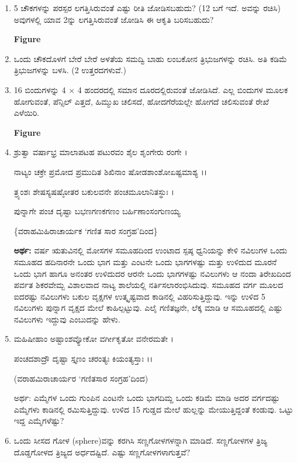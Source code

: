 \begin{enumerate}
\item 5 ಚೌಕಗಳನ್ನು ಪರಸ್ಪರ ಲಗತ್ತಿಸಿರುವಂತೆ ಎಷ್ಟು ರೀತಿ ಜೋಡಿಸಬಹುದು? (12 ಬಗೆ ಇದೆ. ಅವನ್ನು ರಚಿಸಿ) ಅವುಗಳಲ್ಲಿ ಯಾವ 2ನ್ನು ಲಗತ್ತಿಸಿರುವಂತೆ ಜೋಡಿಸಿ ಈ ಆಕೃತಿ ಬರಿಸಬಹುದು? 
\begin{center}
{\bf Figure}
\end{center}

\item ಒಂದು ಚೌಕದೊಳಗೆ ಬೇರೆ ಬೇರೆ ಅಳತೆಯ ಸಮದ್ವಿ ಬಾಹು ಲಂಬಕೋನ ತ್ರಿಭುಜಗಳನ್ನು ರಚಿಸಿ. ಅತಿ ಕಡಿಮೆ ತ್ರಿಭುಜಗಳನ್ನು ಬಳಸಿ. (2 ಉತ್ತರದಗಳುವೆ.)

\item 16 ಬಿಂದುಗಳನ್ನು 4 $\times$ 4 ಹಂದರದಲ್ಲಿ ಸಮಾನ ದೂರದಲ್ಲಿರುವಂತೆ ಜೋಡಿಸಿದೆ. ಎಲ್ಲ ಬಿಂದುಗಳ ಮೂಲಕ ಹೋಗುವಂತೆ, ಪೆನ್ಸಿಲ್ ಎತ್ತದೆ, ಹಿಮ್ಮುಖ ಚಲಿಸದೆ, ಹೋದಗೆರೆಯಲ್ಲೇ ಹೋಗದೆ ಚಲಿಸುವಂತೆ ರೇಖೆ ಎಳೆಯಿರಿ. 
\begin{center}
{\bf Figure}
\end{center}


\item ಶ್ರುತ್ವಾ ವರ್ಷಾಭ್ರ ಮಾಲಾಪಟಹ ಪಟುರವಂ ಶೈಲ ಶೃಂಗೇರು ರಂಗೇ ।

ನಾಟ್ಯಂ ಚಕ್ರೇ ಪ್ರಮೋದ ಪ್ರಮುದಿತ ಶಿಖಿನಾಂ ಷೋಡಶಾಂಶೋಏಷ್ಟಮಾಶ್ಯ ।।

ತ್ರ್ಯಂಶಃ ಶೇಷಸ್ಯಷಷ್ಠೋತರ ಬಕುಲವನೇ ಪಂಚಮೂಲಾನಿತಸ್ಥುಃ ।

ಪುನ್ನಾಗೇ ಪಂಚ ದೃಷ್ಟಾ ಬಭಣಗಣಕಗಣಂ ಬರ್ಹಿಣಾಂಸಂಗುಣಯ್ಯ 

\hfill \{ವರಾಹಮಿಹಿರಾಚಾರ್ಯಕ `ಗಣಿತ ಸಾರ ಸಂಗ್ರಹ'ದಿಂದ\}

{\bf ಅರ್ಥ:} ವರ್ಷ ಋತುವಿನಲ್ಲಿ ಮೋಸಗಳ ಸಮೂಹದಿಂದ ಉಂಟಾದ ಸ್ಪಷ್ಠ ಧ್ವನಿಯನ್ನು ಕೇಳಿ ನವಿಲುಗಳ ಒಂದು ಸಮೂಹದ ಹದಿನಾರನೇ ಒಂದು ಭಾಗ ಮತ್ತು ಎಂಟನೇ ಒಂದು ಭಾಗಗಳಷ್ಟು ಮತ್ತು ಉಳಿದುದ ಮೂರನೆ ಒಂದು ಭಾಗ ಹಾಗೂ ಅನಂತರ ಉಳಿದುದರ ಆರನೇ ಒಂದು ಭಾಗಗಳಷ್ಟು ನವಿಲುಗಳು ಆ ನಂದಾ ತಿರೇಖದಿಂದ ಪರ್ವತ ಶಿಕರವೇಮ್ಬ ವಿಶಾಲವಾದ ನಾಟ್ಯ ಶಾಲೆಯಲ್ಲಿ ನರ್ತಿಸಲಾರಂಭಿಸಿದುವು. ಸಮೂಹದ ವರ್ಗ ಮೂಲದ ಐದರಷ್ಟು ನವಿಲುಗಳು ಬಕುಲ ವೃಕ್ಷಗಳ ಉತ್ಕೃಷ್ಟವಾದ ಕಾಡಿನಲ್ಲಿ ವಿಹರಿಸುತ್ತಿದ್ದುವು. ಇನ್ನು ಉಳಿದ 5 ನವಿಲುಗಳು ಪುನ್ನಾಗ ವೃಕ್ಷದ ಮೇಲೆ ಕಾಹಿಲ್ಪಟ್ಟುವು. ಎಲೈ ಗಣಿತಜ್ಞನೇ, ಲೆಕ್ಕ ಮಾಡಿ ಆ ಸಮೂಹದಲ್ಲಿ ಎಷ್ಟು ನವಿಲುಗಳು ಇದ್ದುವು ಎಂಬುದನ್ನು ಹೇಳು.  

\item ಮಹಿಷೀಹಾಂ ಅಷ್ಟಾಂಶವ್ಯೋಕೋ ವರ್ಗೀಕೃತೋ ವನೇರಮತೇ ।

ಪಂಚದಶಾದ್ರೌ ದೃಷ್ಟಾ ಸ್ತೃಣಂ ಚರಂತ್ಯಃ ಕಿಯಂತ್ಯಸ್ತಾಃ ।।

\hfill (ವರಾಹಮಿರಾಚಾರ್ಯರ `ಗಣಿತಸಾರ ಸಂಗ್ರಹ'ದಿಂದ)

ಅರ್ಥ: ಎಮ್ಮೆಗಳ ಒಂದು ಗುಂಪಿನ ಎಂಟನೇ ಒಂದು ಭಾಗದಿಮ್ದ ಒಂದು ಕಡಿಮೆ ಮಾಡಿ ಅದರ ವರ್ಗದಷ್ಟು ಎಮ್ಮೆಗಳು ಕಾಡಿನಲ್ಲಿ ರಮಿಸುತ್ತಿದ್ದುವು. ಉಳಿದ 15 ಗುಡ್ಡದ ಮೇಲೆ ಹುಲ್ಲನ್ನು ಮೇಯುತ್ತಿದ್ದಂತೆ ಕಂಡುವು. ಒಟ್ಟು ಇದ್ದ ಎಮ್ಮೆಗಳೆಷ್ಟು? 

\item ಒಂದು ಸೀಸದ ಗೋಳ (sphere)ವನ್ನು ಕರಗಿಸಿ ಸಣ್ಣಗೋಳಗಳನ್ನಾಗಿ ಮಾಡಿದೆ. ಸಣ್ಣಗೋಳಗಳ ತ್ರಿಜ್ಯ ದೊಡ್ಡಗೋಳದ ತ್ರಿಜ್ಯದ ಅರ್ಧದಷ್ಟಿದೆ. ಎಷ್ಟು ಸಣ್ಣಗೋಳಗಳಾಗುತ್ತವೆ? 


\end{enumerate}
